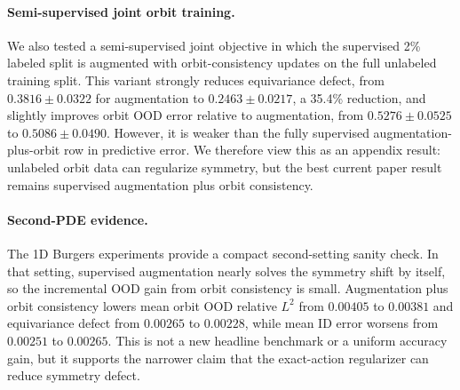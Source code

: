 \begin{table}[t]
\centering
\small
\caption{Unlabeled target-input adaptation at 2\% labels. Rows show projection-head adaptation with orbit preservation for five epochs. Negative OOD delta means lower post-adaptation OOD error; ID drift is the signed change in in-distribution relative \(L^2\).}
\label{tab:new-target-adaptation}
\end{table}

\paragraph{Semi-supervised joint orbit training.} We also tested a semi-supervised joint objective in which the supervised 2\% labeled split is augmented with orbit-consistency updates on the full unlabeled training split. This variant strongly reduces equivariance defect, from \(0.3816\pm0.0322\) for augmentation to \(0.2463\pm0.0217\), a 35.4\% reduction, and slightly improves orbit OOD error relative to augmentation, from \(0.5276\pm0.0525\) to \(0.5086\pm0.0490\). However, it is weaker than the fully supervised augmentation-plus-orbit row in predictive error. We therefore view this as an appendix result: unlabeled orbit data can regularize symmetry, but the best current paper result remains supervised augmentation plus orbit consistency.

\paragraph{Second-PDE evidence.} The 1D Burgers experiments provide a compact second-setting sanity check. In that setting, supervised augmentation nearly solves the symmetry shift by itself, so the incremental OOD gain from orbit consistency is small. Augmentation plus orbit consistency lowers mean orbit OOD relative \(L^2\) from \(0.00405\) to \(0.00381\) and equivariance defect from \(0.00265\) to \(0.00228\), while mean ID error worsens from \(0.00251\) to \(0.00265\). This is not a new headline benchmark or a uniform accuracy gain, but it supports the narrower claim that the exact-action regularizer can reduce symmetry defect.

